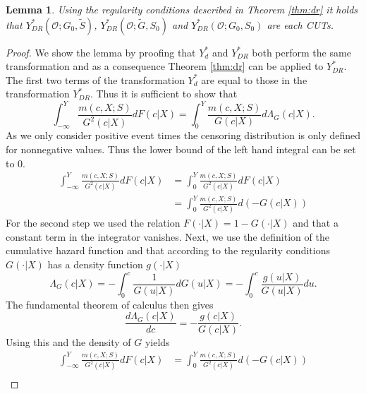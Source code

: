 \documentclass[12pt, a4paper]{scrartcl}
\theoremstyle{definition}
\theoremstyle{plain}
\newtheorem{Lemma}{Lemma}[section]
\numberwithin{equation}{section}
\numberwithin{figure}{section}
\numberwithin{table}{section}
\begin{document}
	\begin{Lemma}
		Using the regularity conditions described in Theorem \ref{thm:dr} it holds that $Y_{DR}^*(\mathcal{O}; G_0, \tilde{S})$, $Y_{DR}^*(\mathcal{O}; \tilde{G}, S_0)$ and $Y_{DR}^*(\mathcal{O}; G_0, S_0)$ are each CUTs.
	\end{Lemma}
	\begin{proof}
		We show the lemma by proofing that $Y_d^*$ and $Y_{DR}^*$ both perform the same transformation and as a consequence Theorem \ref{thm:dr} can be applied to $Y_{DR}^*$.
		The first two terms of the transformation $Y_d^*$ are equal to those in the transformation $Y_{DR}^*$.
		Thus it is sufficient to show that
		\begin{equation*}
		\int_{-\infty}^{Y}\frac{m(c,X;S)}{G^2(c\vert X)}dF(c\vert X) = \int_{0}^{Y} \frac{m(c,X;S)}{G(c \vert X)} d\Lambda_G(c \vert X).
		\end{equation*}
		As we only consider positive event times the censoring distribution is only defined for nonnegative values.
		Thus the lower bound of the left hand integral can be set to 0.
		\begin{equation*}
		\begin{split}
		\int_{-\infty}^{Y}\frac{m(c,X;S)}{G^2(c\vert X)}dF(c\vert X) &= \int_{0}^{Y}\frac{m(c,X;S)}{G^2(c\vert X)}dF(c\vert X)\\
		&= \int_{0}^{Y}\frac{m(c,X;S)}{G^2(c\vert X)}d(-G(c\vert X))
		\end{split}
		\end{equation*}
		For the second step we used the relation $F(\cdot\vert X)= 1-G(\cdot\vert X)$ and that a constant term in the integrator vanishes.
		Next, we use the definition of the cumulative hazard function and that according to the regularity conditions $G(\cdot \vert X)$ has a density function $g(\cdot \vert X)$
		\begin{equation*}
			\Lambda_G(c \vert X) = - \int_{0}^{c}\frac{1}{G(u\vert X)}dG(u\vert X) = - \int_{0}^{c}\frac{g(u\vert X)}{G(u\vert X)}du.
		\end{equation*}
		The fundamental theorem of calculus then gives
		\begin{equation*}
		\frac{d\Lambda_G(c \vert X)}{dc} = -\frac{g(c\vert X)}{G(c\vert X)}.
		\end{equation*}
		Using this and the density of $G$ yields
		\begin{equation*}
		\begin{split}
		\int_{-\infty}^{Y}\frac{m(c,X;S)}{G^2(c\vert X)}dF(c\vert X) &= \int_{0}^{Y}\frac{m(c,X;S)}{G^2(c\vert X)}d(-G(c\vert X))\\

\end{split}
\end{equation*}
\end{proof}
\end{document}
